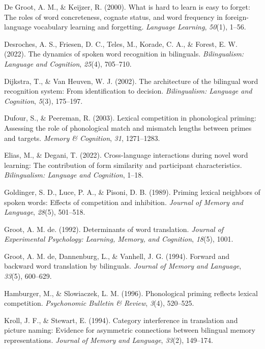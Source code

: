 \documentclass[
]{article}
\newlength{\cslhangindent}
\newenvironment{CSLReferences}[2] %
 {\begin{list}{}{%
  \setlength{\itemindent}{0pt}
  \setlength{\leftmargin}{0pt}
  \setlength{\parsep}{0pt}
  \ifodd #1
   \setlength{\leftmargin}{\cslhangindent}
   \setlength{\itemindent}{-1\cslhangindent}
  \fi
  \setlength{\itemsep}{#2\baselineskip}}}
 {\end{list}}
\begin{document}
\begin{CSLReferences}{1}{0}
De Groot, A. M., \& Keijzer, R. (2000). What is hard to learn is easy to
forget: The roles of word concreteness, cognate status, and word
frequency in foreign-language vocabulary learning and forgetting.
\emph{Language Learning}, \emph{50}(1), 1--56.

Desroches, A. S., Friesen, D. C., Teles, M., Korade, C. A., \& Forest,
E. W. (2022). The dynamics of spoken word recognition in bilinguals.
\emph{Bilingualism: Language and Cognition}, \emph{25}(4), 705--710.

Dijkstra, T., \& Van Heuven, W. J. (2002). The architecture of the
bilingual word recognition system: From identification to decision.
\emph{Bilingualism: Language and Cognition}, \emph{5}(3), 175--197.

Dufour, S., \& Peereman, R. (2003). Lexical competition in phonological
priming: Assessing the role of phonological match and mismatch lengths
between primes and targets. \emph{Memory \& Cognition}, \emph{31},
1271--1283.

Elias, M., \& Degani, T. (2022). Cross-language interactions during
novel word learning: The contribution of form similarity and participant
characteristics. \emph{Bilingualism: Language and Cognition}, 1--18.

Goldinger, S. D., Luce, P. A., \& Pisoni, D. B. (1989). Priming lexical
neighbors of spoken words: Effects of competition and inhibition.
\emph{Journal of Memory and Language}, \emph{28}(5), 501--518.

Groot, A. M. de. (1992). Determinants of word translation. \emph{Journal
of Experimental Psychology: Learning, Memory, and Cognition},
\emph{18}(5), 1001.

Groot, A. M. de, Dannenburg, L., \& Vanhell, J. G. (1994). Forward and
backward word translation by bilinguals. \emph{Journal of Memory and
Language}, \emph{33}(5), 600--629.

Hamburger, M., \& Slowiaczek, L. M. (1996). Phonological priming
reflects lexical competition. \emph{Psychonomic Bulletin \& Review},
\emph{3}(4), 520--525.

Kroll, J. F., \& Stewart, E. (1994). Category interference in
translation and picture naming: Evidence for asymmetric connections
between bilingual memory representations. \emph{Journal of Memory and
Language}, \emph{33}(2), 149--174.


\end{CSLReferences}
\end{document}
